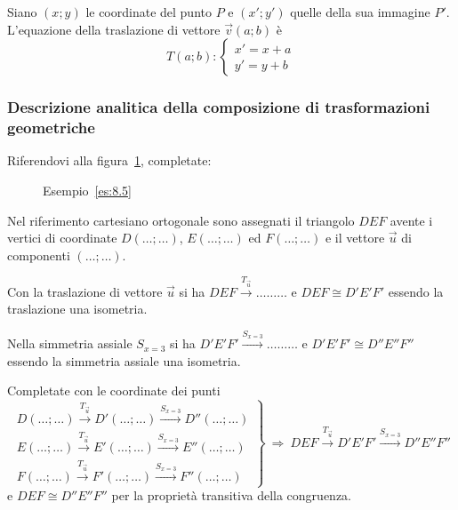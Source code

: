 Siano \((x;y)\) le coordinate del punto \(P\) e \((x';y')\) quelle della 
sua immagine \(P'\). L'equazione della traslazione di vettore 
\(\vec{v}(a;b)\) è
\[T(a;b):\begin{cases}x'=x+a\\y'=y+b\end{cases}\]

\subsubsection{Descrizione analitica della composizione di 
trasformazioni geometriche}

\begin{esempio}\label{es:8.5}
Riferendovi alla figura~\ref{fig:es8.5}, completate:


\begin{inaccessibleblock}
\begin{figure}[!htb]
\centering
\caption{Esempio~\ref{es:8.5}}\label{fig:es8.5}
\end{figure}
\end{inaccessibleblock}

Nel riferimento cartesiano ortogonale sono assegnati il triangolo 
\(DEF\) avente i vertici di coordinate \(D(\ldots{};\ldots{})\), 
\(E(\ldots{};\ldots{})\) ed \(F(\ldots{};\ldots{})\) e il vettore 
\(\vec{u}\) di componenti \((\ldots{};\ldots{})\).

Con la traslazione di vettore \(\vec{u}\) si ha \(DEF 
\overset{T_{\vec{u}}}\rightarrow \ldots\ldots\ldots{}\) e \(DEF\cong 
D'E'F'\) essendo la traslazione una isometria.

Nella simmetria assiale \(S_{x=3}\) si ha \(D'E'F' 
\overset{S_{x=3}}\longrightarrow \ldots\ldots\ldots{}\) e \(D'E'F'\cong 
D''E''F''\) essendo la simmetria assiale una isometria.

Completate con le coordinate dei punti
\[\left.\begin{array}{l}D(\ldots{};\ldots{}) 
\overset{T_{\vec{u}}}\rightarrow 
D'(\ldots{};\ldots{})\overset{S_{x=3}}\longrightarrow 
D''(\ldots{};\ldots{})\\
E(\ldots{};\ldots{}) \overset{T_{\vec{u}}}\rightarrow 
E'(\ldots{};\ldots{})\overset{S_{x=3}}\longrightarrow 
E''(\ldots{};\ldots{})\\
F(\ldots{};\ldots{}) \overset{T_{\vec{u}}}\rightarrow 
F'(\ldots{};\ldots{})\overset{S_{x=3}}\longrightarrow 
F''(\ldots{};\ldots{})\end{array} 
\right\}\:\Rightarrow\:DEF\overset{T_{\vec{u}}}\rightarrow 
D'E'F'\overset{S_{x=3}}\longrightarrow D''E''F''\]
e \(DEF\cong D''E''F''\) per la proprietà transitiva della congruenza.
\end{esempio}

